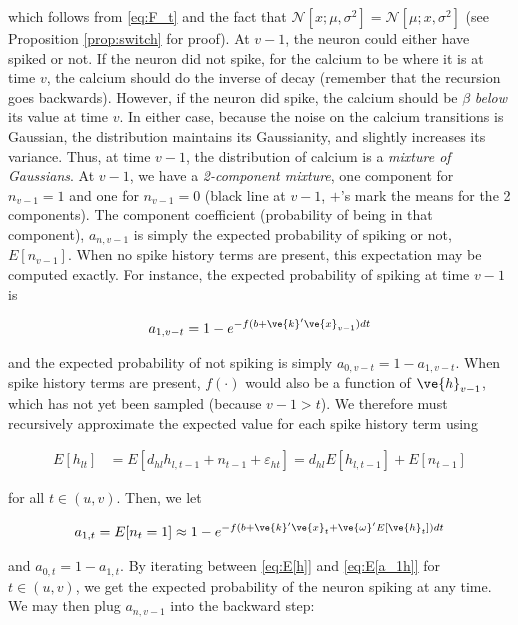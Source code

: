 \noindent which follows from \eqref{eq:F_t} and the fact that $\mathcal{N}[x;\mu,\sigma^2]=\mathcal{N}[\mu;x,\sigma^2]$ (see Proposition \ref{prop:switch} for proof).  At $v-1$, the neuron could either have spiked or not.  If the neuron did not spike, for the calcium to be where it is at time $v$, the calcium should do the inverse of decay (remember that the recursion goes backwards).  However, if the neuron did spike, the calcium should be $\beta$ \emph{below} its value at time $v$.  In either case, because the noise on the calcium transitions is Gaussian, the distribution maintains its Gaussianity, and slightly increases its variance.  Thus, at time $v-1$, the distribution of calcium is a \emph{mixture of Gaussians}.  At $v-1$, we have a \emph{2-component mixture}, one component for $n_{v-1}=1$ and one for $n_{v-1}=0$ (black line at $v-1$, $+$'s mark the means for the 2 components). The component coefficient (probability of being in that component), $a_{n,v-1}$ is simply the expected probability of spiking or not, $E[n_{v-1}]$. When no spike history terms are present, this expectation may be computed exactly.  For instance, the expected probability of spiking at time $v-1$ is

\begin{align} \label{aeq:E[a_1]}
a_{1,v-t} = 1-e^{-f(b+\ve{k}'\ve{x}_{v-1})dt}
\end{align}

\noindent and the expected probability of not spiking is simply $a_{0,v-t}=1-a_{1,v-t}$.  When spike history terms are present, $f(\cdot)$ would also be a function of $\ve{h}_{v-1}$, which has not yet been sampled (because $v-1>t$).  We therefore must recursively approximate the expected value for each spike history term using

\begin{align} \label{aeq:E[h]}
E[h_{lt}] &= E[d_{hl} h_{l,t-1} + n_{t-1} + \varepsilon_{ht}] = d_{hl} E[h_{l,t-1}] + E[n_{t-1}]
\end{align}

\noindent for all $t\in(u,v)$. Then, we let

\begin{align} \label{aeq:E[a_1h]}
a_{1,t} = E[n_{t}=1] \approx 1-e^{-f(b+\ve{k}'\ve{x}_t + \ve{\omega}'E[\ve{h}_t])dt}
\end{align}

\noindent and $a_{0,t}=1-a_{1,t}$. By iterating between \eqref{eq:E[h]} and \eqref{eq:E[a_1h]} for $t\in(u,v)$, we get the expected probability of the neuron spiking at any time.  We may then plug $a_{n,v-1}$ into the backward step:

